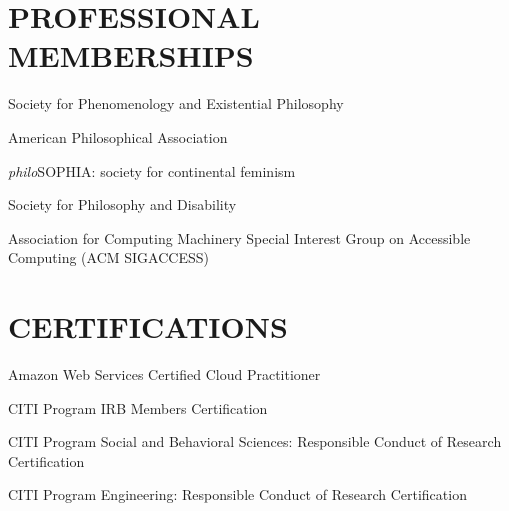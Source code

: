 \documentclass{article}
\newcommand{\listitemspace}{0.25em}
\renewenvironment{itemize}
{\begin{list}{}{\setlength{\leftmargin}{0em}
                \setlength{\parskip}{0em}
                \setlength{\itemsep}{\listitemspace}
                \setlength{\parsep}{\listitemspace}}}
{\end{list}}
\begin{document}
\section*{\normalsize{\MakeUppercase{Professional Memberships}}}
\begin{itemize}
    \item Society for Phenomenology and Existential Philosophy
    \item American Philosophical Association
    \item \textit{philo}SOPHIA: society for continental feminism
    \item Society for Philosophy and Disability
    \item Association for Computing Machinery \textemdash{} Special Interest Group on Accessible Computing (ACM SIGACCESS)
\end{itemize}

\section*{\normalsize{\MakeUppercase{Certifications}}}
\begin{itemize}
    \item Amazon Web Services Certified Cloud Practitioner
    \item CITI Program IRB Members Certification
    \item CITI Program Social and Behavioral Sciences: Responsible Conduct of Research Certification
    \item CITI Program Engineering: Responsible Conduct of Research Certification
\end{itemize}
\end{document}
